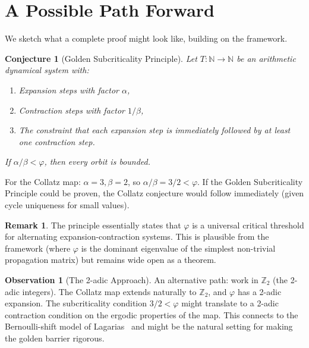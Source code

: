 \documentclass[11pt,a4paper]{article}
\newtheorem{conjecture}[theorem]{Conjecture}
\theoremstyle{definition}
\newtheorem{remark}[theorem]{Remark}
\newtheorem{observation}[theorem]{Observation}
\newcommand{\ZZ}{\mathbb{Z}}
\newcommand{\NN}{\mathbb{N}}
\begin{document}
\section{A Possible Path Forward}\label{sec:path}

We sketch what a complete proof might look like, building on the framework.

\begin{conjecture}[Golden Subcriticality Principle]
Let $T : \NN \to \NN$ be an arithmetic dynamical system with:
\begin{enumerate}[nosep]
  \item Expansion steps with factor $\alpha$,
  \item Contraction steps with factor $1/\beta$,
  \item The constraint that each expansion step is immediately followed by
    at least one contraction step.
\end{enumerate}
If $\alpha/\beta < \varphi$, then every orbit is bounded.
\end{conjecture}

For the Collatz map: $\alpha = 3, \beta = 2$, so $\alpha/\beta = 3/2 < \varphi$.
If the Golden Subcriticality Principle could be proven, the Collatz conjecture
would follow immediately (given cycle uniqueness for small values).

\begin{remark}
The principle essentially states that $\varphi$ is a universal critical
threshold for alternating expansion-contraction systems. This is plausible
from the framework (where $\varphi$ is the dominant eigenvalue of the
simplest non-trivial propagation matrix) but remains wide open as a theorem.
\end{remark}

\begin{observation}[The 2-adic Approach]
An alternative path: work in $\ZZ_2$ (the 2-adic integers). The Collatz map
extends naturally to $\ZZ_2$, and $\varphi$ has a 2-adic expansion.
The subcriticality condition $3/2 < \varphi$ might translate to a 2-adic
contraction condition on the ergodic properties of the map. This connects to
the Bernoulli-shift model of Lagarias~\cite{lagarias} and might be the
natural setting for making the golden barrier rigorous.
\end{observation}

\end{document}
